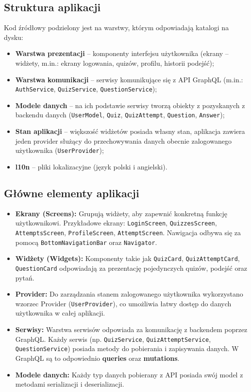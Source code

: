 \documentclass{article}
\begin{document}
	\subsection*{Struktura aplikacji}
		Kod źródłowy podzielony jest na warstwy, którym odpowiadają katalogi na dysku:
		\begin{itemize}
			\item \textbf{Warstwa prezentacji} – komponenty interfejsu użytkownika (ekrany – widżety, m.in.: ekrany logowania, quizów, profilu, historii podejść);
			\item \textbf{Warstwa komunikacji} – serwisy komunikujące się z API GraphQL (m.in.: \texttt{AuthService}, \texttt{QuizService}, \texttt{QuestionService});
			\item \textbf{Modele danych} – na ich podstawie serwisy tworzą obiekty z pozyskanych z backendu danych (\texttt{UserModel}, \texttt{Quiz}, \texttt{QuizAttempt}, \texttt{Question}, \texttt{Answer});
			\item \textbf{Stan aplikacji} – większość widżetów posiada własny stan, aplikacja zawiera jeden provider służący do przechowywania danych obecnie zalogowanego użytkownika (\texttt{UserProvider});
			\item \textbf{l10n} – pliki lokalizacyjne (język polski i angielski).
		\end{itemize}

	\subsection*{Główne elementy aplikacji}
		\begin{itemize}
			\item \textbf{Ekrany (Screens):} Grupują widżety, aby zapewnić konkretną funkcję użytkownikowi. Przykładowe ekrany: \texttt{LoginScreen}, \texttt{QuizzesScreen}, \texttt{AttemptsScreen}, \texttt{ProfileScreen}, \texttt{AttemptScreen}. Nawigacja odbywa się za pomocą \texttt{BottomNavigationBar} oraz \texttt{Navigator}.
			\item \textbf{Widżety (Widgets):} Komponenty takie jak \texttt{QuizCard}, \texttt{QuizAttemptCard}, \texttt{QuestionCard} odpowiadają za prezentację pojedynczych quizów, podejść oraz pytań.
			\item \textbf{Provider:} Do zarządzania stanem zalogowanego użytkownika wykorzystano wzorzec Provider (\texttt{UserProvider}), co umożliwia łatwy dostęp do danych użytkownika w całej aplikacji.
			\item \textbf{Serwisy:} Warstwa serwisów odpowiada za komunikację z backendem poprzez GraphQL. Każdy serwis (np. \texttt{QuizService}, \texttt{QuizAttemptService}, \texttt{QuestionService}) posiada metody do pobierania i zapisywania danych. W GraphQL są to odpowiednio \textbf{queries} oraz \textbf{mutations}.
			\item \textbf{Modele danych:} Każdy typ danych pobierany z API posiada swój model z metodami serializacji i deserializacji.
		\end{itemize}
\end{document}
